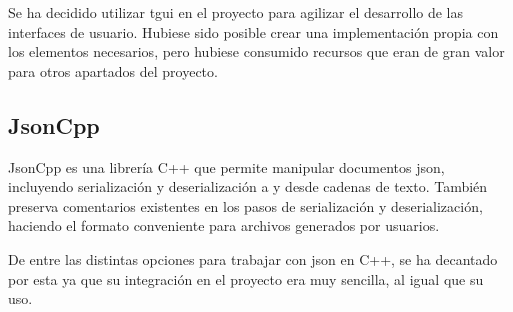 		Se ha decidido utilizar \acrshort{tgui} en el proyecto para agilizar el desarrollo de las interfaces de usuario. Hubiese sido posible crear una implementación propia con los elementos necesarios, pero hubiese consumido recursos que eran de gran valor para otros apartados del proyecto.

	\subsection{JsonCpp}

		JsonCpp es una librería C++ que permite manipular documentos \acrshort{json}, incluyendo serialización y deserialización a y desde cadenas de texto. También preserva comentarios existentes en los pasos de serialización y deserialización, haciendo el formato conveniente para archivos generados por usuarios.

		De entre las distintas opciones para trabajar con \acrshort{json} en C++, se ha decantado por esta ya que su integración en el proyecto era muy sencilla, al igual que su uso.
